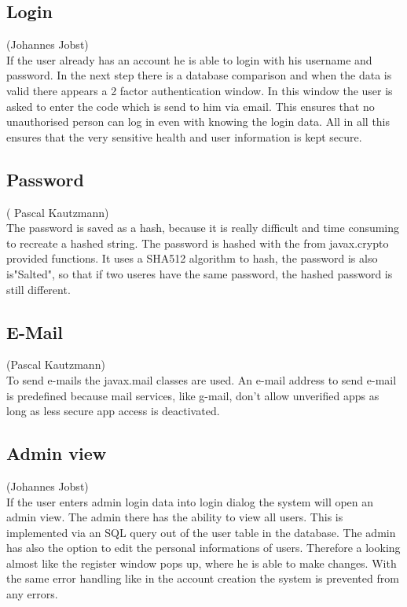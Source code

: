 \documentclass[a4paper, 12pt]{report}
\begin{document}
\subsection{Login}
{\tiny (Johannes Jobst)\\}
If the user already has an account he is able to login with his username and password. In the next step there is a database comparison and when the data is valid there appears a 2 factor authentication window. In this window the user is asked to enter the code which is send to him via email. This ensures that no unauthorised person can log in even with knowing the login data. All in all this ensures that the very sensitive health and user information is kept secure.

\subsection{Password}
{\tiny ( Pascal Kautzmann)\\}
The password is saved as a hash, because it is really difficult and time consuming to recreate a hashed string.
The password is hashed with the from javax.crypto provided functions. It uses a SHA512 algorithm  to hash, the password is also is"Salted", so that if two useres have the same password, the hashed password is still different.

\subsection{E-Mail}
{\tiny (Pascal Kautzmann)\\}
To send e-mails the javax.mail classes are used. An e-mail address to send e-mail is predefined %
because mail services, like g-mail, don't allow unverified apps as long as  less secure app access is deactivated. 


\subsection{Admin view}
{\tiny (Johannes Jobst)\\}
If the user enters admin login data into login dialog the system will open an admin view. The admin there has the ability to view all users. This is implemented via an SQL query out of the user table in the database. The admin has also the option to edit the personal informations of users. Therefore a looking almost like the register window pops up, where he is able to make changes.
With the same error handling like in the account creation the system is prevented from any errors.
\end{document}
